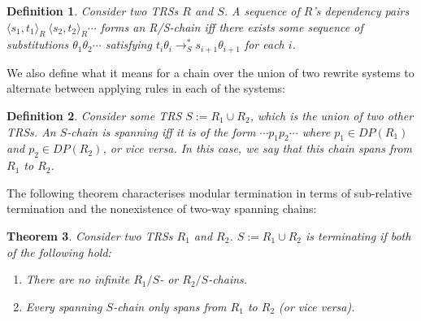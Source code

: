 \documentclass{article}
\newtheorem{theorem}{Theorem}[section]
\newtheorem{definition}[theorem]{Definition}
\newcommand{\dpair}[2]{\langle #1, #2 \rangle}
\begin{document}
\begin{definition}
    Consider two TRSs $R$ and $S$. A sequence of $R$'s dependency pairs $\dpair{s_1}{t_1}_R ~ \dpair{s_2}{t_2}_R \cdots$ forms an \emph{R/S-chain} iff there exists some sequence of substitutions $\theta_1 \theta_2 \cdots$ satisfying $t_i \theta_i \rightarrow^*_S s_{i+1}\theta_{i+1}$ for each $i$. 
\end{definition}

We also define what it means for a chain over the union of two rewrite systems to alternate between applying rules in each of the systems:
\begin{definition}
    Consider some TRS $S := R_1 \cup R_2$, which is the union of two other TRSs. An $S$-chain is \emph{spanning} iff it is of the form $\cdots p_1 p_2 \cdots$ where $p_1 \in DP(R_1)$ and $p_2 \in DP(R_2)$, or vice versa. In this case, we say that this chain spans \emph{from} $R_1$ \emph{to} $R_2$.
\end{definition}
The following theorem characterises modular termination in terms of sub-relative termination and the nonexistence of two-way spanning chains:
\begin{theorem} \label{thm:mod_span_term}
    Consider two TRSs $R_1$ and $R_2$. $S := R_1 \cup R_2$ is terminating if both of the following hold: \begin{enumerate}
        \item There are no infinite $R_1/S$- or $R_2/S$-chains. \label{cond:no_r_chains}
        \item Every spanning $S$-chain only spans from $R_1$ to $R_2$ (or vice versa). \label{cond:no_span_chains}
    \end{enumerate}
\end{theorem}
\end{document}
